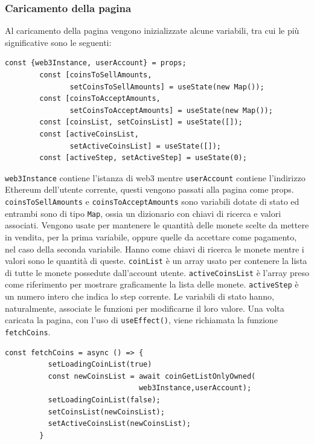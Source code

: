 \documentclass[a4paper]{article}
\begin{document}
        \subsubsection{Caricamento della pagina}
        Al caricamento della pagina vengono inizializzate alcune variabili, tra cui le più significative sono le seguenti:
        \begin{lstlisting}[style=ES6, title={Inizializzazione delle variabili al caricamento della pagina Create Sale}]
        const {web3Instance, userAccount} = props;
        const [coinsToSellAmounts,
               setCoinsToSellAmounts] = useState(new Map());
        const [coinsToAcceptAmounts,
               setCoinsToAcceptAmounts] = useState(new Map());
        const [coinsList, setCoinsList] = useState([]);
        const [activeCoinsList,
               setActiveCoinsList] = useState([]);
        const [activeStep, setActiveStep] = useState(0);\end{lstlisting}
        \verb|web3Instance| contiene l'istanza di web3 mentre \verb|userAccount| contiene l'indirizzo Ethereum dell'utente corrente, questi vengono passati alla pagina come props.
        \newline
        \verb|coinsToSellAmounts| e \verb|coinsToAcceptAmounts| sono variabili dotate di stato ed entrambi sono di tipo \verb|Map|, ossia un dizionario con chiavi di ricerca e valori associati.
        Vengono usate per mantenere le quantità delle monete scelte da mettere in vendita, per la prima variabile, oppure quelle da accettare come pagamento, nel caso della seconda variabile.
        Hanno come chiavi di ricerca le monete mentre i valori sono le quantità di queste.
        \newline
        \verb|coinList| è un array usato per contenere la lista di tutte le monete possedute dall'account utente.
        \newline
        \verb|activeCoinsList| è l'array preso come riferimento per mostrare graficamente la lista delle monete.
        \newline
        \verb|activeStep| è un numero intero che indica lo step corrente.
        \newline
        Le variabili di stato hanno, naturalmente, associate le funzioni per modificarne il loro valore.
        \newline
        Una volta caricata la pagina, con l'uso di \verb|useEffect()|, viene richiamata la funzione \verb|fetchCoins|.
        \begin{lstlisting}[style=ES6, title={Funzione fetchCoins}]
        const fetchCoins = async () => {
          setLoadingCoinList(true)
          const newCoinsList = await coinGetListOnlyOwned(
                               web3Instance,userAccount);
          setLoadingCoinList(false);
          setCoinsList(newCoinsList);
          setActiveCoinsList(newCoinsList);
        }\end{lstlisting}
\end{document}

